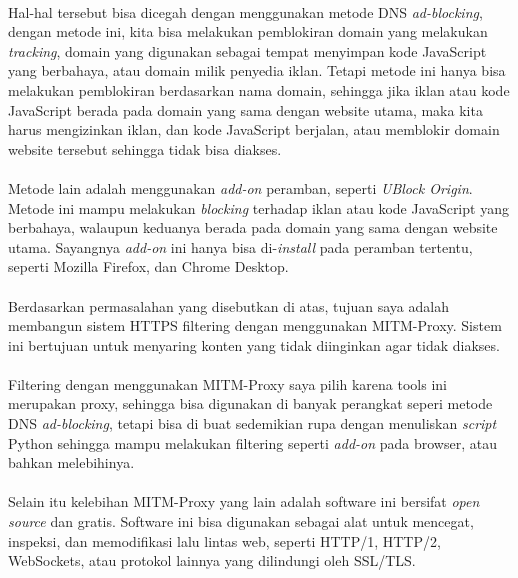 \documentclass[./bab_1.tex]{subfiles}
\begin{document}
  \paragraph*{}Hal-hal tersebut bisa dicegah dengan
  menggunakan metode DNS \textit{ad-blocking}, dengan metode
  ini, kita bisa melakukan pemblokiran domain yang melakukan
  \textit{tracking}, domain yang digunakan sebagai
  tempat menyimpan kode JavaScript yang berbahaya, atau
  domain milik penyedia iklan. Tetapi metode
  ini hanya bisa melakukan pemblokiran berdasarkan nama
  domain, sehingga jika iklan atau kode JavaScript berada
  pada domain yang sama dengan website utama, maka kita
  harus mengizinkan iklan, dan kode JavaScript berjalan,
  atau memblokir domain website tersebut sehingga tidak bisa
  diakses.

  \paragraph*{}Metode lain adalah menggunakan
  \textit{add-on} peramban, seperti \textit{UBlock Origin}.
  Metode ini mampu melakukan \textit{blocking} terhadap
  iklan atau kode JavaScript yang berbahaya, walaupun
  keduanya berada pada domain yang sama dengan website
  utama. Sayangnya \textit{add-on} ini hanya bisa
  di-\textit{install} pada peramban tertentu, seperti
  Mozilla Firefox, dan Chrome Desktop.

  \paragraph*{}Berdasarkan permasalahan yang disebutkan
  di atas, tujuan saya adalah membangun sistem HTTPS
  filtering dengan menggunakan MITM-Proxy. Sistem ini
  bertujuan untuk menyaring konten yang tidak diinginkan
  agar tidak diakses.

  \paragraph*{}Filtering dengan menggunakan MITM-Proxy saya
  pilih karena tools ini merupakan proxy, sehingga bisa
  digunakan di banyak perangkat seperi metode DNS
  \textit{ad-blocking}, tetapi bisa di buat sedemikian rupa
  dengan menuliskan \textit{script} Python sehingga mampu
  melakukan filtering seperti \textit{add-on} pada browser,
  atau bahkan melebihinya.

  \paragraph*{}Selain itu kelebihan MITM-Proxy yang lain
  adalah software ini bersifat \textit{open source} dan
  gratis. Software ini bisa digunakan sebagai alat untuk
  mencegat, inspeksi, dan memodifikasi lalu lintas web,
  seperti HTTP/1, HTTP/2, WebSockets, atau protokol lainnya
  yang dilindungi oleh SSL/TLS.
\end{document}
